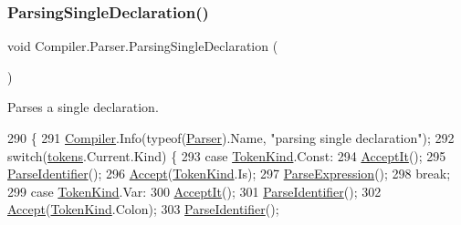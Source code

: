 \subsubsection{\texorpdfstring{Parsing\+Single\+Declaration()}{ParsingSingleDeclaration()}}
{\footnotesize\ttfamily void Compiler.\+Parser.\+Parsing\+Single\+Declaration (\begin{DoxyParamCaption}{ }\end{DoxyParamCaption})\hspace{0.3cm}{\ttfamily [protected]}}

Parses a single declaration. 
\begin{DoxyCode}
290                                                               \{
291                         \mbox{\hyperlink{namespace_compiler}{Compiler}}.Info(typeof(\mbox{\hyperlink{class_compiler_1_1_parser_a450e11452db3f91ff866fc1e36ebc79d}{Parser}}).Name, \textcolor{stringliteral}{"parsing single declaration"});
292                         \textcolor{keywordflow}{switch}(\mbox{\hyperlink{class_compiler_1_1_parser_a4db075175c853a197c7b8db7d787a0a5}{tokens}}.Current.Kind) \{
293                             \textcolor{keywordflow}{case} \mbox{\hyperlink{namespace_compiler_a57929962f25004759596fc3f13cf563c}{TokenKind}}.Const:
294                                 \mbox{\hyperlink{class_compiler_1_1_parser_ae19e507e1e2460cbad35b03d24402b4f}{AcceptIt}}();
295                                 \mbox{\hyperlink{class_compiler_1_1_parser_af099ac84308e83bf30b3dfd6dc51bd32}{ParseIdentifier}}();
296                                 \mbox{\hyperlink{class_compiler_1_1_parser_aaedaac51ec193dd68541fd9d39fddde8}{Accept}}(\mbox{\hyperlink{namespace_compiler_a57929962f25004759596fc3f13cf563c}{TokenKind}}.Is);
297                                 \mbox{\hyperlink{class_compiler_1_1_parser_a8c6c2073d17ac572fb9117892cbf5aa1}{ParseExpression}}();
298                                 \textcolor{keywordflow}{break};
299                             \textcolor{keywordflow}{case} \mbox{\hyperlink{namespace_compiler_a57929962f25004759596fc3f13cf563c}{TokenKind}}.Var:
300                                 \mbox{\hyperlink{class_compiler_1_1_parser_ae19e507e1e2460cbad35b03d24402b4f}{AcceptIt}}();
301                                 \mbox{\hyperlink{class_compiler_1_1_parser_af099ac84308e83bf30b3dfd6dc51bd32}{ParseIdentifier}}();
302                                 \mbox{\hyperlink{class_compiler_1_1_parser_aaedaac51ec193dd68541fd9d39fddde8}{Accept}}(\mbox{\hyperlink{namespace_compiler_a57929962f25004759596fc3f13cf563c}{TokenKind}}.Colon);
303                                 \mbox{\hyperlink{class_compiler_1_1_parser_af099ac84308e83bf30b3dfd6dc51bd32}{ParseIdentifier}}();

\end{DoxyCode}
